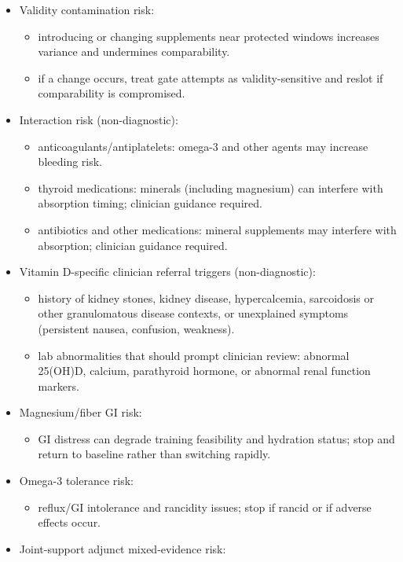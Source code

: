 \documentclass[10pt]{article}
\begin{document}
\begin{itemize}
\item Validity contamination risk:
  \begin{itemize}
  \item introducing or changing supplements near protected windows increases variance and undermines comparability.
  \item if a change occurs, treat gate attempts as validity-sensitive and reslot if comparability is compromised.
  \end{itemize}
\item Interaction risk (non-diagnostic):
  \begin{itemize}
  \item anticoagulants/antiplatelets: omega-3 and other agents may increase bleeding risk.
  \item thyroid medications: minerals (including magnesium) can interfere with absorption timing; clinician guidance required.
  \item antibiotics and other medications: mineral supplements may interfere with absorption; clinician guidance required.
  \end{itemize}
\item Vitamin D-specific clinician referral triggers (non-diagnostic):
  \begin{itemize}
  \item history of kidney stones, kidney disease, hypercalcemia, sarcoidosis or other granulomatous disease contexts, or unexplained symptoms (persistent nausea, confusion, weakness).
  \item lab abnormalities that should prompt clinician review: abnormal 25(OH)D, calcium, parathyroid hormone, or abnormal renal function markers.
  \end{itemize}
\item Magnesium/fiber GI risk:
  \begin{itemize}
  \item GI distress can degrade training feasibility and hydration status; stop and return to baseline rather than switching rapidly.
  \end{itemize}
\item Omega-3 tolerance risk:
  \begin{itemize}
  \item reflux/GI intolerance and rancidity issues; stop if rancid or if adverse effects occur.
  \end{itemize}
\item Joint-support adjunct mixed-evidence risk:

\end{itemize}
\end{document}
